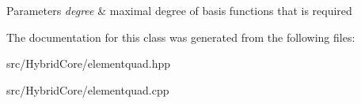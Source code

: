\begin{DoxyParams}{Parameters}
{\em degree} & maximal degree of basis functions that is required \\
\hline
\end{DoxyParams}


The documentation for this class was generated from the following files\+:\begin{DoxyCompactItemize}
\item 
src/\+Hybrid\+Core/elementquad.\+hpp\item 
src/\+Hybrid\+Core/elementquad.\+cpp\end{DoxyCompactItemize}
